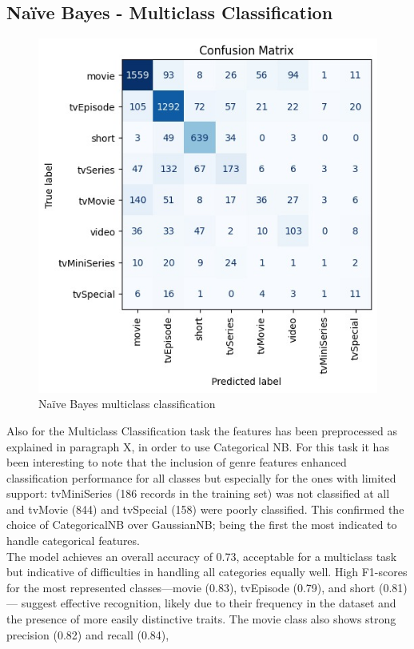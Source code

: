 \subsection{Naïve Bayes - Multiclass Classification}    
\begin{figure}
    \centering
    \captionsetup{justification=raggedleft, width=1\linewidth}
    \caption{Naïve Bayes multiclass classification}
    \label{fig:nb_multiclass}
    \includegraphics[width=0.9\linewidth]{plots/nb_multiclass_confmatrix.jpg}
\end{figure}
Also for the Multiclass Classification task the features has been preprocessed as explained in paragraph X, 
in order to use Categorical NB. For this task it has been interesting to note that the inclusion of genre features enhanced classification performance 
for all classes but especially for the ones with limited support: tvMiniSeries (186 records in the training set) was not classified at all and tvMovie (844) and tvSpecial (158) 
were poorly classified. This confirmed the choice of CategoricalNB over GaussianNB; being the first the most indicated to handle categorical features.\\
The model achieves an overall accuracy of 0.73, acceptable for a multiclass task but indicative of difficulties in handling all categories equally well. 
High F1-scores for the most represented classes—movie (0.83), tvEpisode (0.79), and short (0.81) — suggest effective recognition, likely due to their frequency in the dataset and the presence of more easily distinctive traits. The movie class also shows strong precision (0.82) and recall (0.84), 
